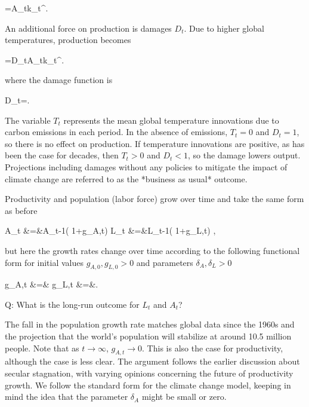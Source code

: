 ﻿\documentclass[oneside]{book}
\begin{document}
=A_{t}k_{t}^{\alpha }.




An additional force on production is damages $D_{t}$. Due to higher
global temperatures, production becomes



=D_{t}A_{t}k_{t}^{\alpha }.


where the damage function is



D_{t}=.


The variable $T_{t}$ represents the mean global temperature innovations due to
carbon emissions in each period. In the absence of emissions, $T_{t}=0$
and $D_{t}=1$, so there is no effect on production. If temperature
innovations are positive, as has been the case for decades, then $T_{t}>0$
and $D_{t}<1$, so the damage lowers output. Projections including damages
without any policies to mitigate the impact of climate change are referred
to as the *business as usual* outcome.

Productivity and population (labor force) grow over time and take the same
form as before



A_{t} &=&A_{t-1}( 1+g_{A,t})
L_{t} &=&L_{t-1}( 1+g_{L,t}) ,



but here the growth rates change over time according to the following
functional form for initial values $g_{A,0},g_{L,0}>0$ and parameters $\delta _{A},\delta _{L}>0$



g_{A,t} &=&
g_{L,t} &=&.




Q: What is the long-run outcome for $L_{t}$ and $A_{t}$?

The fall in the population growth rate matches global data since the 1960s and the projection that the world's population will stabilize at around 10.5 million people. Note that as $t\rightarrow
\infty $, $g_{A,t}\rightarrow 0$. This is also the case for productivity,
although the case is less clear. The argument follows the earlier discussion
about secular stagnation, with varying opinions concerning the future of
productivity growth. We follow the standard form for the climate change model,
keeping in mind the idea that the parameter $\delta _{A}$ might be small or
zero.
\end{document}
